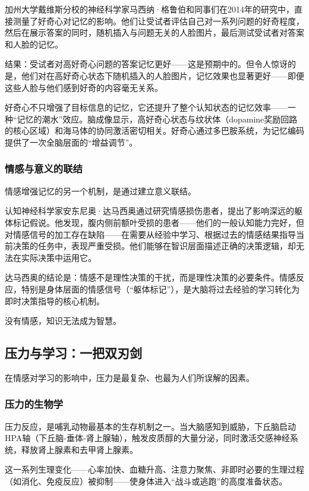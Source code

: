 \documentclass[11pt]{article}
\begin{document}
加州大学戴维斯分校的神经科学家马西纳·格鲁伯和同事们在2014年的研究中，直接测量了好奇心对记忆的影响。他们让受试者评估自己对一系列问题的好奇程度，然后在展示答案的同时，随机插入与问题无关的人脸图片，最后测试受试者对答案和人脸的记忆。

结果：受试者对高好奇心问题的答案记忆更好——这是预期中的。但令人惊讶的是，他们对在高好奇心状态下随机插入的人脸图片，记忆效果也显著更好——即便这些人脸与他们感到好奇的内容毫无关系。

好奇心不只增强了目标信息的记忆，它还提升了整个认知状态的记忆效率——一种“记忆的潮水”效应。脑成像显示，高好奇心状态与纹状体（dopamine奖励回路的核心区域）和海马体的协同激活密切相关。好奇心通过多巴胺系统，为记忆编码提供了一次全脑层面的“增益调节”。
\subsubsection{情感与意义的联结}
\label{sec:org9b1c285}

情感增强记忆的另一个机制，是通过建立意义联结。

认知神经科学家安东尼奥·达马西奥通过研究情感损伤患者，提出了影响深远的躯体标记假说。他发现，腹内侧前额叶受损的患者——他们的一般认知能力完好，但对情感信号的加工存在缺陷——在需要从经验中学习、根据过去的情感结果指导当前决策的任务中，表现严重受损。他们能够在智识层面描述正确的决策逻辑，却无法在实际决策中运用它。

达马西奥的结论是：情感不是理性决策的干扰，而是理性决策的必要条件。情感反应，特别是身体层面的情感信号（“躯体标记”），是大脑将过去经验的学习转化为即时决策指导的核心机制。

没有情感，知识无法成为智慧。
\subsection{压力与学习：一把双刃剑}
\label{sec:org62ee42a}

在情感对学习的影响中，压力是最复杂、也最为人们所误解的因素。
\subsubsection{压力的生物学}
\label{sec:org99e7d4b}

压力反应，是哺乳动物最基本的生存机制之一。当大脑感知到威胁，下丘脑启动HPA轴（下丘脑-垂体-肾上腺轴），触发皮质醇的大量分泌，同时激活交感神经系统，释放肾上腺素和去甲肾上腺素。

这一系列生理变化——心率加快、血糖升高、注意力聚焦、非即时必要的生理过程（如消化、免疫反应）被抑制——使身体进入“战斗或逃跑”的高度准备状态。
\end{document}

